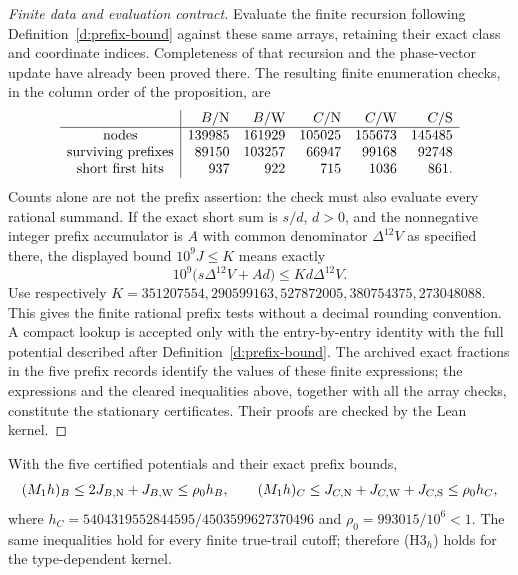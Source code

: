 \begin{proof}[Finite data and evaluation contract]
Evaluate the finite recursion following
Definition~\ref{d:prefix-bound} against these same arrays, retaining
their exact class and coordinate indices. Completeness of that
recursion and the phase-vector update have already been proved
there. The resulting finite enumeration checks, in the column
order of the proposition, are
\[
 \begin{array}{c|rrrrr}
 &B/{\rm N}&B/{\rm W}&C/{\rm N}&C/{\rm W}&C/{\rm S}\\ \hline
 \text{nodes}&139985&161929&105025&155673&145485\\
 \text{surviving prefixes}&89150&103257&66947&99168&92748\\
 \text{short first hits}&937&922&715&1036&861.
 \end{array}
\]
Counts alone are not the prefix assertion: the check must also
evaluate every rational summand. If the exact short sum is
\(s/d\), \(d>0\), and the nonnegative integer prefix accumulator
is \(A\) with common denominator \(\Delta^{12}V\) as specified
there, the displayed bound \(10^9J\le K\) means exactly
\[
 10^9\bigl(s\Delta^{12}V+Ad\bigr)
                  \le Kd\Delta^{12}V .
\]
Use respectively
\(K=351207554,290599163,527872005,380754375,273048088\).
This gives the finite rational prefix tests without a decimal
rounding convention. A compact lookup is accepted only with the
entry-by-entry identity with the full potential described after
Definition~\ref{d:prefix-bound}.
The archived exact fractions in the five prefix records identify
the values of these finite expressions; the expressions and the
cleared inequalities above, together with all the array checks,
constitute the stationary certificates. Their proofs are checked by
the Lean kernel.
\end{proof}

\begin{lemma}\label{l:stationary-assembly}
With the five certified potentials and their exact prefix bounds,
\[
 (M_1h)_B\le2J_{B,{\rm N}}+J_{B,{\rm W}}\le\rho_0h_B,\qquad
 (M_1h)_C\le J_{C,{\rm N}}+J_{C,{\rm W}}+J_{C,{\rm S}}
                                      \le\rho_0h_C ,
\]
where \(h_C=5404319552844595/4503599627370496\) and
\(\rho_0=993015/10^6<1\).
The same inequalities hold for every finite true-trail cutoff;
therefore (H3\(_h\)) holds for the type-dependent kernel.
\end{lemma}


